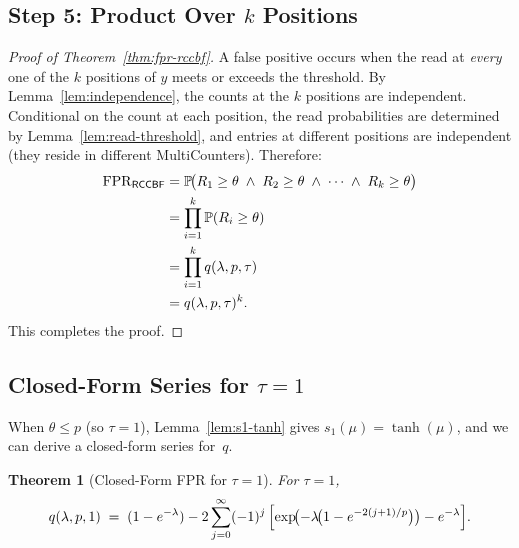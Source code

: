 \documentclass[11pt,a4paper]{article}
\newtheorem{theorem}{Theorem}[section]
\newcommand{\RCCBF}{\textsf{RCCBF}}
\newcommand{\FPR}{\mathrm{FPR}}
\newcommand{\Prob}{\mathbb{P}}
\begin{document}
\subsection{Step 5: Product Over \texorpdfstring{$k$}{k} Positions}
\label{ssec:fpr-step5}

\begin{proof}[Proof of Theorem~\ref{thm:fpr-rccbf}]
A false positive occurs when the read at \emph{every} one of the $k$
positions of $y$ meets or exceeds the threshold.  By
Lemma~\ref{lem:independence}, the counts at the $k$ positions are
independent.  Conditional on the count at each position, the read
probabilities are determined by Lemma~\ref{lem:read-threshold}, and entries
at different positions are independent (they reside in different
MultiCounters).  Therefore:
\begin{align}
  \FPR_{\RCCBF}
  &= \Prob\!\bigl(R_1 \ge \theta \;\wedge\; R_2 \ge \theta
     \;\wedge\; \cdots \;\wedge\; R_k \ge \theta\bigr) \notag \\
  &= \prod_{i=1}^{k} \Prob(R_i \ge \theta) \notag \\
  &= \prod_{i=1}^{k} q(\lambda, p, \tau) \notag \\
  &= q(\lambda, p, \tau)^k.
  \label{eq:fpr-product}
\end{align}
This completes the proof.
\end{proof}

\subsection{Closed-Form Series for \texorpdfstring{$\tau = 1$}{tau=1}}
\label{ssec:fpr-closedform}

When $\theta \le p$ (so $\tau = 1$), Lemma~\ref{lem:s1-tanh} gives
$s_1(\mu) = \tanh(\mu)$, and we can derive a closed-form series
for~$q$.

\begin{theorem}[Closed-Form FPR for $\tau=1$]\label{thm:fpr-tau1}
For $\tau = 1$,
\begin{equation}\label{eq:q-tau1}
  q(\lambda, p, 1)
  \;=\; (1 - e^{-\lambda})
        - 2\sum_{j=0}^{\infty} (-1)^j\,
        \Bigl[\exp\!\bigl(-\lambda\!\bigl(1 - e^{-2(j+1)/p}\bigr)\bigr)
              - e^{-\lambda}\Bigr].
\end{equation}
\end{theorem}
\end{document}
